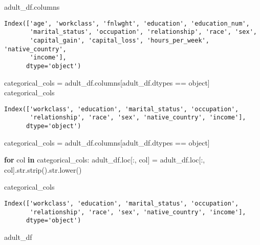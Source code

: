 \documentclass[
  letterpaper,
  DIV=11,
  numbers=noendperiod]{scrartcl}
\newenvironment{Shaded}{\begin{snugshade}}{\end{snugshade}}
\newcommand{\BuiltInTok}[1]{\textcolor[rgb]{0.00,0.23,0.31}{#1}}
\newcommand{\ControlFlowTok}[1]{\textcolor[rgb]{0.00,0.23,0.31}{\textbf{#1}}}
\newcommand{\KeywordTok}[1]{\textcolor[rgb]{0.00,0.23,0.31}{\textbf{#1}}}
\newcommand{\NormalTok}[1]{\textcolor[rgb]{0.00,0.23,0.31}{#1}}
\newcommand{\OperatorTok}[1]{\textcolor[rgb]{0.37,0.37,0.37}{#1}}
\begin{document}
\begin{Shaded}
\begin{Highlighting}[]
\NormalTok{adult\_df.columns}
\end{Highlighting}
\end{Shaded}

\begin{verbatim}
Index(['age', 'workclass', 'fnlwght', 'education', 'education_num',
       'marital_status', 'occupation', 'relationship', 'race', 'sex',
       'capital_gain', 'capital_loss', 'hours_per_week', 'native_country',
       'income'],
      dtype='object')
\end{verbatim}

\begin{Shaded}
\begin{Highlighting}[]
\NormalTok{categorical\_cols }\OperatorTok{=}\NormalTok{ adult\_df.columns[adult\_df.dtypes }\OperatorTok{==} \BuiltInTok{object}\NormalTok{]}
\NormalTok{categorical\_cols}
\end{Highlighting}
\end{Shaded}

\begin{verbatim}
Index(['workclass', 'education', 'marital_status', 'occupation',
       'relationship', 'race', 'sex', 'native_country', 'income'],
      dtype='object')
\end{verbatim}

\begin{Shaded}
\begin{Highlighting}[]
\NormalTok{categorical\_cols }\OperatorTok{=}\NormalTok{ adult\_df.columns[adult\_df.dtypes }\OperatorTok{==} \BuiltInTok{object}\NormalTok{]}

\ControlFlowTok{for}\NormalTok{ col }\KeywordTok{in}\NormalTok{ categorical\_cols: }
\NormalTok{    adult\_df.loc[:, col] }\OperatorTok{=}\NormalTok{ adult\_df.loc[:, col].}\BuiltInTok{str}\NormalTok{.strip().}\BuiltInTok{str}\NormalTok{.lower()}

\NormalTok{categorical\_cols}
\end{Highlighting}
\end{Shaded}

\begin{verbatim}
Index(['workclass', 'education', 'marital_status', 'occupation',
       'relationship', 'race', 'sex', 'native_country', 'income'],
      dtype='object')
\end{verbatim}

\begin{Shaded}
\begin{Highlighting}[]
\NormalTok{adult\_df}
\end{Highlighting}
\end{Shaded}
\end{document}
